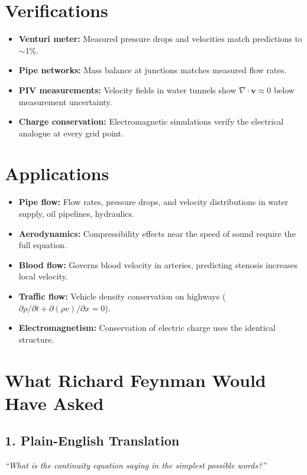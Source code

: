 \documentclass[11pt,openright]{book}
\begin{document}
\section*{Verifications}

\begin{itemize}
\item \textbf{Venturi meter:} Measured pressure drops and velocities match predictions to $\sim$1\%.
\item \textbf{Pipe networks:} Mass balance at junctions matches measured flow rates.
\item \textbf{PIV measurements:} Velocity fields in water tunnels show $\nabla \cdot \mathbf{v} \approx 0$ below measurement uncertainty.
\item \textbf{Charge conservation:} Electromagnetic simulations verify the electrical analogue at every grid point.
\end{itemize}
\section*{Applications}

\begin{itemize}
\item \textbf{Pipe flow:} Flow rates, pressure drops, and velocity distributions in water supply, oil pipelines, hydraulics.
\item \textbf{Aerodynamics:} Compressibility effects near the speed of sound require the full equation.
\item \textbf{Blood flow:} Governs blood velocity in arteries, predicting stenosis increases local velocity.
\item \textbf{Traffic flow:} Vehicle density conservation on highways ($\partial \rho / \partial t + \partial (\rho v) / \partial x = 0$).
\item \textbf{Electromagnetism:} Conservation of electric charge uses the identical structure.
\end{itemize}
\section*{What Richard Feynman Would Have Asked}

\subsection*{1. Plain-English Translation}
\textit{``What is the continuity equation saying in the simplest possible words?''}
\end{document}

